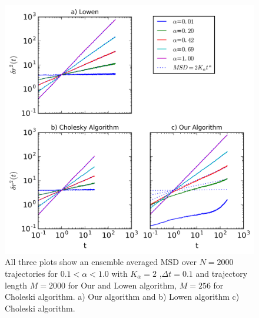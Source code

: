 \documentclass[
  a4paper,BCOR10mm,oneside,
  bibtotoc,idxtotoc,
  headsepline,footsepline,%
  fleqn,openbib
]{scrbook}
\begin{document}

\begin{figure}[h!]
\centering
\includegraphics[width=\textwidth]{./data/alpha_changethree.png}
\caption{All three plots show an ensemble averaged MSD over $N=2000$ trajectories for $0.1<\alpha<1.0$  with $K_{\alpha}=2$ ,$\Delta t = 0.1$ and trajectory length $M=2000$  for Our and Lowen algorithm, $M=256$ for Choleski algorithm. a) Our algorithm and b) Lowen algorithm c) Choleski algorithm.}
\label{alphachange}
\end{figure}
\end{document}

